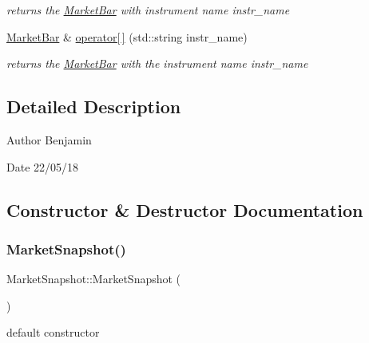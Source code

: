 \begin{DoxyCompactItemize}
\begin{DoxyCompactList}\small\item\em returns the \hyperlink{classMarketBar}{Market\+Bar} with instrument name {\ttfamily instr\+\_\+name} \end{DoxyCompactList}\item 
\hyperlink{classMarketBar}{Market\+Bar} \& \hyperlink{classMarketSnapshot_a5029cc166d5c7b895686a25feb0c3af4}{operator\mbox{[}$\,$\mbox{]}} (std\+::string instr\+\_\+name)
\begin{DoxyCompactList}\small\item\em returns the \hyperlink{classMarketBar}{Market\+Bar} with the instrument name \textquotesingle{}instr\+\_\+name\textquotesingle{} \end{DoxyCompactList}\end{DoxyCompactItemize}


\subsection{Detailed Description}
\begin{DoxyAuthor}{Author}
Benjamin 
\end{DoxyAuthor}
\begin{DoxyDate}{Date}
22/05/18 
\end{DoxyDate}


\subsection{Constructor \& Destructor Documentation}
\mbox{\label{classMarketSnapshot_afb9edf14f6472bfcae695c5f4a46abff}} 
\subsubsection{\texorpdfstring{Market\+Snapshot()}{MarketSnapshot()}\hspace{0.1cm}{\footnotesize\ttfamily [1/2]}}
{\footnotesize\ttfamily Market\+Snapshot\+::\+Market\+Snapshot (\begin{DoxyParamCaption}{ }\end{DoxyParamCaption})\hspace{0.3cm}{\ttfamily [default]}}



default constructor 

